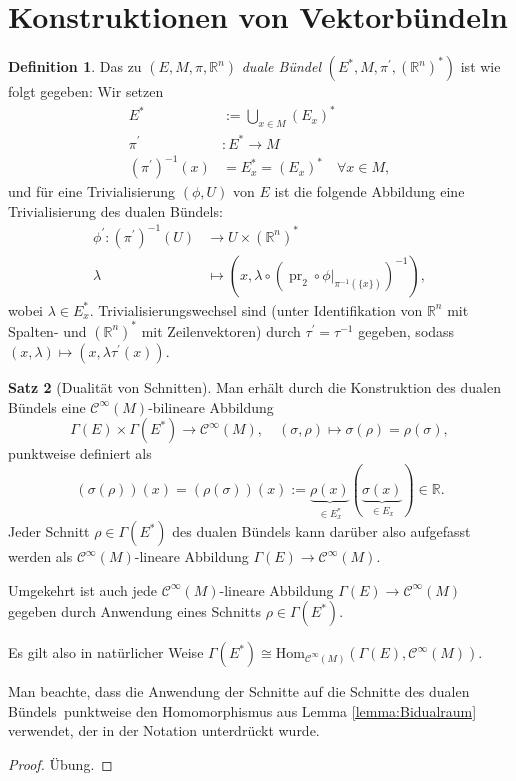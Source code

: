 \documentclass[a4paper]{scrreprt}
\numberwithin{equation}{chapter}
\DeclareMathOperator{\pr}{pr}
\newcommand{\R}{\mathbb{R}}
\newcommand{\sC}{\mathcal{C}^{\infty}}
\theoremstyle{definition}
\newtheorem{defn}{Definition}[section]
\newtheorem{satz}[defn]{Satz}
\newcommand{\bewUeb}{\begin{proof}Übung.\end{proof}}
\begin{document}
	\section{Konstruktionen von Vektorbündeln}
		\begin{defn}
			Das zu $(E,M,\pi,\R^{n})$ \emph{duale Bündel} $(E^*,M,\pi^{\prime},(\R^n)^*)$ ist wie folgt gegeben: Wir setzen
			\begin{align*}
				E^*&:=\bigcup_{x\in M}(E_{x})^*\\
				\pi^{\prime}&\colon E^*\rightarrow M\\
				(\pi^{\prime})^{-1}(x)&=E^*_x=(E_{x})^*\quad \forall x\in M,
			\end{align*}
			und für eine Trivialisierung $(\phi,U)$ von $E$ ist die folgende Abbildung eine Trivialisierung des dualen Bündels:
			\begin{align*}
				\phi^{\prime}\colon(\pi^{\prime})^{-1}(U)&\rightarrow U\times (\R^n)^*\\
				\lambda&\mapsto\left(x,\lambda\circ({\pr_2}\circ\phi\vert_{\pi^{-1}(\lbrace x\rbrace)})^{-1}\right),
			\end{align*}
			wobei $\lambda\in E_x^*$. Trivialisierungswechsel sind (unter Identifikation von $\R^n$ mit Spalten- und $(\R^n)^*$ mit Zeilenvektoren) durch $\tau^{\prime}=\tau^{-1}$ gegeben, sodass $(x,\lambda)\mapsto(x,\lambda\tau^{\prime}(x))$.
		\end{defn}
		
		\begin{satz}[Dualität von Schnitten]\label{satz:Dualität}
			Man erhält durch die Konstruktion des dualen Bündels eine $\sC(M)$-bilineare Abbildung
			\[\Gamma(E)\times\Gamma(E^*)\rightarrow \sC(M),\quad (\sigma,\rho)\mapsto \sigma(\rho)=\rho(\sigma),\]
			punktweise definiert als
			\[(\sigma(\rho))(x)=(\rho(\sigma))(x):=\underbrace{\rho(x)}_{\in E^*_x}(\underbrace{\sigma(x)}_{\in E_x})\in \R.\]
			Jeder Schnitt $\rho \in \Gamma(E^*)$ des dualen Bündels kann darüber also aufgefasst werden als $\sC(M)$-lineare Abbildung $\Gamma(E) \to \sC(M)$.
			
			Umgekehrt ist auch jede $\sC(M)$-lineare Abbildung $\Gamma(E) \to \sC(M)$ gegeben durch Anwendung eines Schnitts $\rho \in \Gamma(E^*)$.
			
			Es gilt also in natürlicher Weise $\Gamma(E^*)\cong \mathrm{Hom}_{\sC(M)}(\Gamma(E),\sC(M))$. 
			
			Man beachte, dass die \glqq Anwendung der Schnitte auf die Schnitte des dualen Bündels\grqq\ punktweise den Homomorphismus aus Lemma \ref{lemma:Bidualraum} verwendet, der in der Notation unterdrückt wurde.
			\bewUeb
		\end{satz}
	
\end{document}
